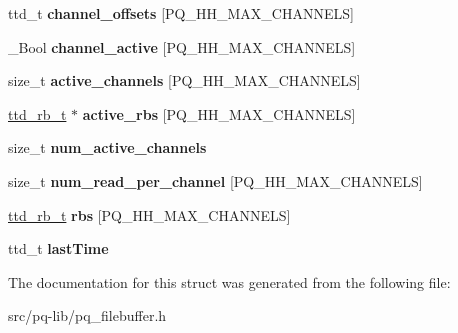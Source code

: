 \begin{DoxyCompactItemize}
\item 
\hypertarget{structpq__fb__t_a17fcb11f11f7816fb6ac936b9e3aead9}{}ttd\+\_\+t {\bfseries channel\+\_\+offsets} \mbox{[}P\+Q\+\_\+\+H\+H\+\_\+\+M\+A\+X\+\_\+\+C\+H\+A\+N\+N\+E\+L\+S\mbox{]}\label{structpq__fb__t_a17fcb11f11f7816fb6ac936b9e3aead9}

\item 
\hypertarget{structpq__fb__t_a6164c1dd3161f99554fb289e2956c0d0}{}\+\_\+\+Bool {\bfseries channel\+\_\+active} \mbox{[}P\+Q\+\_\+\+H\+H\+\_\+\+M\+A\+X\+\_\+\+C\+H\+A\+N\+N\+E\+L\+S\mbox{]}\label{structpq__fb__t_a6164c1dd3161f99554fb289e2956c0d0}

\item 
\hypertarget{structpq__fb__t_ad563a0cec93bb7277c5461deca1d2fdc}{}size\+\_\+t {\bfseries active\+\_\+channels} \mbox{[}P\+Q\+\_\+\+H\+H\+\_\+\+M\+A\+X\+\_\+\+C\+H\+A\+N\+N\+E\+L\+S\mbox{]}\label{structpq__fb__t_ad563a0cec93bb7277c5461deca1d2fdc}

\item 
\hypertarget{structpq__fb__t_a14862dbfee658e2372f2427613379410}{}\hyperlink{structttd__rb__t}{ttd\+\_\+rb\+\_\+t} $\ast$ {\bfseries active\+\_\+rbs} \mbox{[}P\+Q\+\_\+\+H\+H\+\_\+\+M\+A\+X\+\_\+\+C\+H\+A\+N\+N\+E\+L\+S\mbox{]}\label{structpq__fb__t_a14862dbfee658e2372f2427613379410}

\item 
\hypertarget{structpq__fb__t_af4d962092f59f859a5b31c06be8924c1}{}size\+\_\+t {\bfseries num\+\_\+active\+\_\+channels}\label{structpq__fb__t_af4d962092f59f859a5b31c06be8924c1}

\item 
\hypertarget{structpq__fb__t_af0d588bc598d68ba657125a2e191f048}{}size\+\_\+t {\bfseries num\+\_\+read\+\_\+per\+\_\+channel} \mbox{[}P\+Q\+\_\+\+H\+H\+\_\+\+M\+A\+X\+\_\+\+C\+H\+A\+N\+N\+E\+L\+S\mbox{]}\label{structpq__fb__t_af0d588bc598d68ba657125a2e191f048}

\item 
\hypertarget{structpq__fb__t_a2faa0f3de601ef77601480b836838e3a}{}\hyperlink{structttd__rb__t}{ttd\+\_\+rb\+\_\+t} {\bfseries rbs} \mbox{[}P\+Q\+\_\+\+H\+H\+\_\+\+M\+A\+X\+\_\+\+C\+H\+A\+N\+N\+E\+L\+S\mbox{]}\label{structpq__fb__t_a2faa0f3de601ef77601480b836838e3a}

\item 
\hypertarget{structpq__fb__t_a0120f52a9585c66f8f2eacbcfebe6ad9}{}ttd\+\_\+t {\bfseries last\+Time}\label{structpq__fb__t_a0120f52a9585c66f8f2eacbcfebe6ad9}

\end{DoxyCompactItemize}


The documentation for this struct was generated from the following file\+:\begin{DoxyCompactItemize}
\item 
src/pq-\/lib/pq\+\_\+filebuffer.\+h\end{DoxyCompactItemize}
